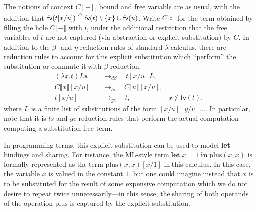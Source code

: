 The notions of context $C[-]$, bound and free variable are as usual, with the addition that $\textsf{fv} (t [x/u]) \stackrel{\triangle}{=} \textsf{fv} (t) \setminus \{ x \} \cup \textsf{fv} (u)$.
Write $C \llbracket t \rrbracket$ for the term obtained by filling the hole $C \llbracket - \rrbracket$ with $t$, under the additional restriction that the free variables of $t$ are not captured (via abstraction or explicit substitution) by $C$.
In addition to the $\beta$- and $\eta$-reduction rules of standard $\lambda$-calculus, there are reduction rules to account for this explicit substitution which \enquote{perform} the substitution or commute it with $\beta$-reduction:
\begin{equation}
\label{eq:lambda_lsub_reduction}
\begin{aligned}
	(\lambda x. t) L u              \quad & \to_{d\beta} \quad t[x/u] L,                                                \\
	C \llbracket x \rrbracket [x/u] \quad & \to_{ls} \quad C \llbracket u \rrbracket [x/u],                             \\
	t [x/u]                         \quad & \to_{gc} \quad t,                               & x \notin \textsf{fv} (t),
\end{aligned}
\end{equation}
where $L$ is a finite list of substitutions of the form $[x/u] [y/v] \ldots$.
In particular, note that it is $ls$ and $gc$ reduction rules that perform the actual computation computing a substitution-free term.

In programming terms, this explicit substitution can be used to model \textbf{let}-bindings and sharing.
For instance, the ML-style term $\textbf{let} \; x = 1 \; \textbf{in} \; \text{plus} (x, x)$ is formally represented as the term $\text{plus} (x, x) [x / 1]$ in this calculus.
In this case, the variable $x$ is valued in the constant $1$, but one could imagine instead that $x$ is to be substituted for the result of some expensive computation which we do not desire to repeat twice unnecessarily---in this sense, the sharing of both operands of the operation $\text{plus}$ is captured by the explicit substitution.

